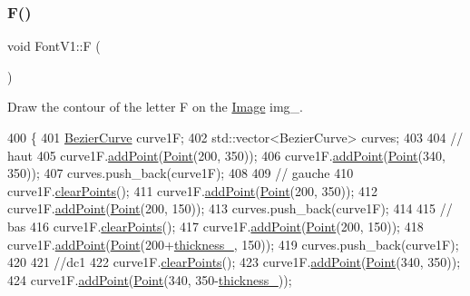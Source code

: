 \subsubsection{\texorpdfstring{F()}{F()}}
{\footnotesize\ttfamily void Font\+V1\+::F (\begin{DoxyParamCaption}{ }\end{DoxyParamCaption})}



Draw the contour of the letter F on the \mbox{\hyperlink{class_image}{Image}} img\+\_\+. 


\begin{DoxyCode}
400               \{
401     \mbox{\hyperlink{class_bezier_curve}{BezierCurve}} curve1F;
402     std::vector<BezierCurve> curves;
403 
404     \textcolor{comment}{// haut}
405     curve1F.\mbox{\hyperlink{class_bezier_curve_a38d16c18b36ae45619b05e26e226cf34}{addPoint}}(\mbox{\hyperlink{class_point}{Point}}(200, 350));
406     curve1F.\mbox{\hyperlink{class_bezier_curve_a38d16c18b36ae45619b05e26e226cf34}{addPoint}}(\mbox{\hyperlink{class_point}{Point}}(340, 350));
407     curves.push\_back(curve1F);
408 
409     \textcolor{comment}{// gauche}
410     curve1F.\mbox{\hyperlink{class_bezier_curve_a0ba8ce66d5af5971ae6a1b506029728e}{clearPoints}}();
411     curve1F.\mbox{\hyperlink{class_bezier_curve_a38d16c18b36ae45619b05e26e226cf34}{addPoint}}(\mbox{\hyperlink{class_point}{Point}}(200, 350));
412     curve1F.\mbox{\hyperlink{class_bezier_curve_a38d16c18b36ae45619b05e26e226cf34}{addPoint}}(\mbox{\hyperlink{class_point}{Point}}(200, 150));
413     curves.push\_back(curve1F);
414 
415     \textcolor{comment}{// bas}
416     curve1F.\mbox{\hyperlink{class_bezier_curve_a0ba8ce66d5af5971ae6a1b506029728e}{clearPoints}}();
417     curve1F.\mbox{\hyperlink{class_bezier_curve_a38d16c18b36ae45619b05e26e226cf34}{addPoint}}(\mbox{\hyperlink{class_point}{Point}}(200, 150));
418     curve1F.\mbox{\hyperlink{class_bezier_curve_a38d16c18b36ae45619b05e26e226cf34}{addPoint}}(\mbox{\hyperlink{class_point}{Point}}(200+\mbox{\hyperlink{class_font_v1_aed8040e76be9a52833627b92f0fb4e5f}{thickness\_}}, 150));
419     curves.push\_back(curve1F);
420 
421     \textcolor{comment}{//dc1}
422     curve1F.\mbox{\hyperlink{class_bezier_curve_a0ba8ce66d5af5971ae6a1b506029728e}{clearPoints}}();
423     curve1F.\mbox{\hyperlink{class_bezier_curve_a38d16c18b36ae45619b05e26e226cf34}{addPoint}}(\mbox{\hyperlink{class_point}{Point}}(340, 350));
424     curve1F.\mbox{\hyperlink{class_bezier_curve_a38d16c18b36ae45619b05e26e226cf34}{addPoint}}(\mbox{\hyperlink{class_point}{Point}}(340, 350-\mbox{\hyperlink{class_font_v1_aed8040e76be9a52833627b92f0fb4e5f}{thickness\_}}));

\end{DoxyCode}
